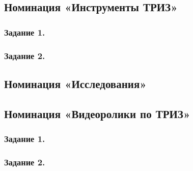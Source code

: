 \documentclass[11pt,a4paper]{article}
\begin{document}
\subsection{Номинация «Инструменты ТРИЗ»}

\subsubsection*{Задание 1.}\BlackBox
\subsubsection*{Задание 2.}\CosmicInventions

\subsection{Номинация «Исследования»}

\BlackBoxOfCivilization

\subsection{Номинация «Видеоролики по ТРИЗ»}

\subsubsection*{Задание 1.}\VideoOne
\subsubsection*{Задание 2.}\VideoThree

\GeneralText
\end{document}
